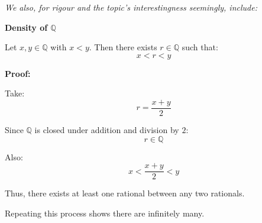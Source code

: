 \documentclass[11pt]{article}
\newcommand{\Q}{\mathbb{Q}}
\begin{document}
\textit{We also, for rigour and the topic's interestingness seemingly, include:}

\begin{theorybox}

\textbf{Density of $\Q$}

Let $x,y \in \Q$ with $x < y$.  
Then there exists $r \in \Q$ such that:
\[
x < r < y
\]

\textbf{Proof:}

Take:
\[
r = \frac{x+y}{2}
\]

Since $\Q$ is closed under addition and division by $2$:
\[
r \in \Q
\]

Also:
\[
x < \frac{x+y}{2} < y
\]

Thus, there exists at least one rational between any two rationals.

Repeating this process shows there are infinitely many.

\end{theorybox}

\begin{center}
\end{center}
\end{document}
